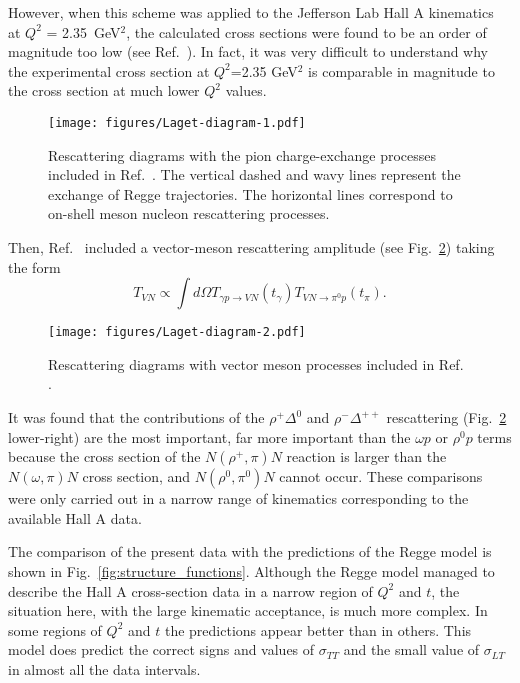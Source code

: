 \documentclass[prc,floatfix,twocolumn,superscriptaddress,letter]{revtex4}
\begin{document}
However, when  this scheme was applied to the Jefferson Lab Hall A kinematics~\cite{Hall-A-pi0}  at 
$Q^2$ = 2.35~GeV$^2$, the calculated cross sections were found to be an order of magnitude too low (see Ref.~\cite{Laget}). In fact, it was very difficult to understand why the experimental cross section at $Q^2$=2.35 GeV$^2$ is comparable in magnitude to the cross section  at much lower $Q^2$ values.

\begin{figure}
\texttt{[image: figures/Laget-diagram-1.pdf]}
\caption{ \label{rescatter-pi-1}Rescattering diagrams with the pion charge-exchange processes included in Ref.~\cite{Laget}. The vertical dashed and wavy lines represent the exchange of Regge trajectories. The horizontal lines correspond to on-shell  meson nucleon rescattering processes. }
\end{figure} 


Then, Ref.~\cite{Laget}  included a vector-meson rescattering amplitude (see Fig.~\ref{rescatter}) taking  the form
$$T_{VN}\propto \int d\Omega T_{\gamma p\to VN}(t_\gamma ) T_{VN \to \pi^0p}(t_\pi).$$
\begin{figure}
\texttt{[image: figures/Laget-diagram-2.pdf]}
\caption{ \label{rescatter}Rescattering diagrams with vector meson processes included in  Ref.~\cite{Laget} .}
\end{figure} 
It was found that the contributions of the $\rho^+ \Delta^0$ and $\rho^- \Delta^{++}$  rescattering (Fig.~\ref{rescatter} lower-right) are the most important, far more important than the $\omega p$ or $\rho^0p$  terms because the cross section of the $N(\rho^+,\pi)N$ reaction is larger than the $N(\omega,\pi)N$ cross section, and $N(\rho^0,\pi^0)N$  cannot occur.  These comparisons were only carried out in a narrow range of kinematics  corresponding to the available Hall A data. 

The comparison of the present data with the predictions of the Regge model \cite{Laget} is shown in Fig.~\ref{fig:structure_functions}.
Although the Regge model managed to describe the Hall A cross-section data in a narrow region of $Q^2$ and $t$, the situation here, with the large kinematic acceptance, is much more complex. In some regions of $Q^2$ and $t$ the predictions appear better than in others. This model does predict the correct signs and values of $\sigma_{TT}$ and the small value of $\sigma_{LT}$  in almost all the data intervals. 

\vspace{0.1in}
\end{document}
